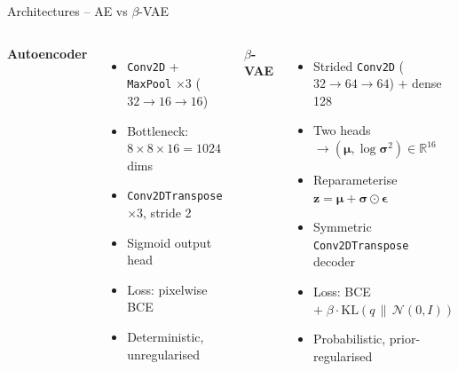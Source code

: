 \documentclass[aspectratio=169]{beamer}
\begin{document}
\begin{frame}{Architectures -- AE vs $\beta$-VAE}
  \begin{columns}[T]
    \textbf{Autoencoder}
    \begin{itemize}
      \item \texttt{Conv2D} + \texttt{MaxPool} $\times 3$ ($32{\to}16{\to}16$)
      \item Bottleneck: $8{\times}8{\times}16 = 1024$ dims
      \item \texttt{Conv2DTranspose} $\times 3$, stride 2
      \item Sigmoid output head
      \item Loss: pixelwise BCE
      \item Deterministic, unregularised
    \end{itemize}

    \textbf{$\beta$-VAE}
    \begin{itemize}
      \item Strided \texttt{Conv2D} ($32{\to}64{\to}64$) + dense 128
      \item Two heads $\to (\boldsymbol{\mu}, \log \boldsymbol{\sigma}^2) \in \mathbb{R}^{16}$
      \item Reparameterise $\mathbf{z}=\boldsymbol{\mu}+\boldsymbol{\sigma}\odot\boldsymbol{\epsilon}$
      \item Symmetric \texttt{Conv2DTranspose} decoder
      \item Loss: BCE $+\;\beta \cdot \mathrm{KL}(q\,\|\,\mathcal{N}(0,I))$
      \item Probabilistic, prior-regularised
    \end{itemize}
  \end{columns}
\end{frame}
\end{document}

